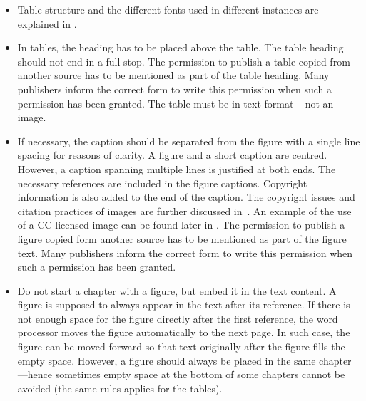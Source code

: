 \begin{itemize}
    \setlength\itemsep{0pt}
    \setlength\parskip{0pt}
  \item Table structure and the different fonts used in different
    instances are explained in
    .
  \item In tables, the heading has to be placed above the table. The
    table heading should
    not end in a full stop. The permission to publish a table copied
    from another
    source has to be mentioned as part of the table heading. Many
    publishers inform
    the correct form to write this permission when such a permission has been
    granted. The table must be in text format – not an image.
  \item If necessary, the caption should be separated from the figure
    with a single line spacing for reasons of clarity. A figure and a
    short caption are centred. However, a caption spanning multiple
    lines is justified at both ends. The necessary references are
    included in the figure captions. Copyright information is
    also added to the end of the caption. The copyright issues and
    citation practices of images
    are further discussed in~. An example of the
    use of a CC-licensed image can
    be found later in . The permission to
    publish a figure copied form another source has to be mentioned
    as part of the
    figure text. Many publishers inform the correct form to write
    this permission
    when such a permission has been granted.
  \item Do not start a chapter with a figure, but embed it in the
    text content. A figure is
    supposed to always appear in the text after its reference. If
    there is not enough
    space for the figure directly after the first reference, the word
    processor moves the
    figure automatically to the next page. In such case, the figure can be moved
    forward so that text originally after the figure fills the empty
    space. However, a
    figure should always be placed in the same chapter---hence sometimes empty
    space at the bottom of some chapters cannot be avoided (the same
      rules applies for the
    tables).
\end{itemize}

